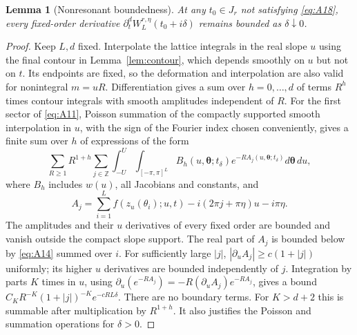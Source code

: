\documentclass[11pt,a4paper]{article}
\numberwithin{equation}{section}
\theoremstyle{plain}
\newtheorem{lemma}[theorem]{Lemma}
\theoremstyle{definition}
\begin{document}
\begin{lemma}[Nonresonant boundedness]\label{lem:nonres}
At any $t_0\in J_r$ not satisfying \eqref{eq:A18}, every fixed-order derivative $\partial_t^d W_L^{r,\eta}(t_0+i\delta)$ remains bounded as $\delta\downarrow0$.
\end{lemma}
\begin{proof}
Keep $L,d$ fixed. Interpolate the lattice integrals in the real slope $u$ using the final contour in Lemma~\ref{lem:contour}, which depends smoothly on $u$ but not on $t$. Its endpoints are fixed, so the deformation and interpolation are also valid for nonintegral $m=uR$. Differentiation gives a sum over $h=0,\ldots,d$ of terms $R^h$ times contour integrals with smooth amplitudes independent of $R$. For the first sector of \eqref{eq:A11}, Poisson summation of the compactly supported smooth interpolation in $u$, with the sign of the Fourier index chosen conveniently, gives a finite sum over $h$ of expressions of the form
\begin{equation}
\sum_{R\ge1}R^{1+h}\sum_{j\in\mathbb Z}\int_{-U}^U\int_{[-\pi,\pi]^L}
 B_h(u,\boldsymbol\theta;t_\delta)e^{-R A_j(u,\boldsymbol\theta;t_\delta)}d\boldsymbol\theta\,du,\label{eq:exactpoisson}
\end{equation}
where $B_h$ includes $w(u)$, all Jacobians and constants, and
\[
A_j=\sum_{i=1}^L f(z_u(\theta_i);u,t)-i(2\pi j+\pi\eta)u-i\pi\eta.
\]
The amplitudes and their $u$ derivatives of every fixed order are bounded and vanish outside the compact slope support. The real part of $A_j$ is bounded below by \eqref{eq:A14} summed over $i$. For sufficiently large $|j|$, $|\partial_u A_j|\ge c(1+|j|)$ uniformly; its higher $u$ derivatives are bounded independently of $j$. Integration by parts $K$ times in $u$, using $\partial_u(e^{-RA_j})=-R(\partial_u A_j)e^{-RA_j}$, gives a bound $C_K R^{-K}(1+|j|)^{-K}e^{-cRL\delta}$. There are no boundary terms. For $K>d+2$ this is summable after multiplication by $R^{1+h}$. It also justifies the Poisson and summation operations for $\delta>0$.


\end{proof}
\end{document}

